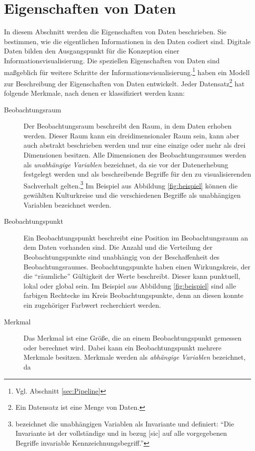 \documentclass[a4paper, 
               12pt,
               DIV=calc,
               version=first,
               pdftex,
               headsepline,
               footsepline,
               bibliography=totocnumbered,
               listof=numbered]{scrreprt}
\begin{document}
\section{Eigenschaften von Daten}
\label{sec:EigenschaftenDaten}
In diesem Abschnitt werden die Eigenschaften von Daten beschrieben. Sie bestimmen, wie die eigentlichen Informationen
in den Daten codiert sind.
Digitale Daten bilden den Ausgangspunkt für die Konzeption einer Informationsvisualisierung. Die speziellen
Eigenschaften von Daten sind maßgeblich für weitere Schritte der Informationsvisualisierung.\footnote{Vgl. 
Abschnitt \ref{sec:Pipeline}}
\cite{Schumann} haben ein Modell zur Beschreibung der Eigenschaften von Daten entwickelt. Jeder Datensatz\footnote{Ein
Datensatz ist eine Menge von Daten.}
hat folgende Merkmale, nach denen er klassifiziert werden kann:
\begin{description}
\item[Beobachtungsraum]
Der Beobachtungsraum beschreibt den Raum, in dem Daten erhoben werden. Dieser Raum kann ein
dreidimensionaler Raum sein, kann aber auch abstrakt beschrieben werden und nur eine einzige oder
mehr als drei Dimensionen besitzen. Alle Dimensionen des Beobachtungsraumes werden als \textit{unabhängige
Variablen} bezeichnet, da sie vor der Datenerhebung festgelegt werden und als beschreibende Begriffe für
den zu visualisierenden Sachverhalt gelten.\footnote{\citep[S.\,24]{Bertin} bezeichnet die unabhängigen
Variablen als Invariante und definiert: "`Die Invariante ist der vollständige und in bezug [sic] auf alle vorgegebenen
Begriffe invariable Kennzeichnungsbegriff."'} Im Beispiel aus Abbildung \ref{fig:beispiel} können die
gewählten Kulturkreise und die verschiedenen Begriffe als unabhängigen Variablen bezeichnet werden.
\item[Beobachtungspunkt]
Ein Beobachtungspunkt beschreibt eine Position im Beobachtungsraum an dem Daten vorhanden sind. Die Anzahl und die Verteilung
der Beobachtungspunkte sind unabhängig von der Beschaffenheit des Beobachtungsraumes. Beobachtungspunkte haben einen
Wirkungskreis, der die "`räumliche"' Gültigkeit der Werte beschreibt. Dieser kann punktuell, lokal oder global sein.
Im Beispiel aus Abbildung \ref{fig:beispiel} sind alle farbigen Rechtecke im Kreis Beobachtungspunkte, denn an
diesen konnte ein zugehöriger Farbwert recherchiert werden.
\item[Merkmal]
Das Merkmal ist eine Größe, die an einem Beobachtungspunkt gemessen oder berechnet wird. Dabei kann
ein Beobachtungspunkt mehrere Merkmale besitzen. Merkmale werden als \textit{abhängige Variablen} bezeichnet, da

\end{description}
\end{document}
